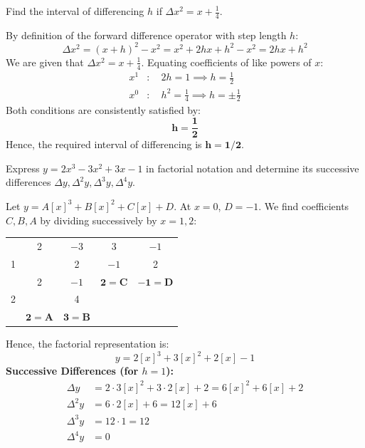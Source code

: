 \documentclass[11pt,a4paper]{article}
\begin{document}
\begin{exambox}
Find the interval of differencing $h$ if $\Delta x^2 = x + \frac{1}{4}$.
\end{exambox}

\begin{solbox}
By definition of the forward difference operator with step length $h$:
$$\Delta x^2 = (x + h)^2 - x^2 = x^2 + 2hx + h^2 - x^2 = 2hx + h^2$$
We are given that $\Delta x^2 = x + \frac{1}{4}$. Equating coefficients of like powers of $x$:
\begin{align*}
    x^1&: \quad 2h = 1 \implies h = \frac{1}{2} \\
    x^0&: \quad h^2 = \frac{1}{4} \implies h = \pm \frac{1}{2}
\end{align*}
Both conditions are consistently satisfied by:
$$\mathbf{h = \frac{1}{2}}$$
Hence, the required interval of differencing is $\mathbf{h = 1/2}$.
\end{solbox}

\begin{exambox}
Express $y = 2x^3 - 3x^2 + 3x - 1$ in factorial notation and determine its successive differences $\Delta y, \Delta^2 y, \Delta^3 y, \Delta^4 y$.
\end{exambox}

\begin{solbox}
Let $y = A[x]^3 + B[x]^2 + C[x] + D$.
At $x = 0$, $D = -1$.
We find coefficients $C, B, A$ by dividing successively by $x = 1, 2$:
\begin{center}
\begin{tabular}{c|cccc}
    & 2 & $-3$ & 3 & $-1$ \\
    1 & & 2 & $-1$ & 2 \\
    \hline
    & 2 & $-1$ & $\mathbf{2 = C}$ & $\mathbf{-1 = D}$ \\
    2 & & 4 & & \\
    \hline
    & $\mathbf{2 = A}$ & $\mathbf{3 = B}$ & &
\end{tabular}
\end{center}
Hence, the factorial representation is:
\begin{equation}
    \boxed{y = 2[x]^3 + 3[x]^2 + 2[x] - 1}
\end{equation}
\textbf{Successive Differences (for $h = 1$):}
\begin{align*}
    \Delta y &= 2 \cdot 3[x]^2 + 3 \cdot 2[x] + 2 = 6[x]^2 + 6[x] + 2 \\
    \Delta^2 y &= 6 \cdot 2[x] + 6 = 12[x] + 6 \\
    \Delta^3 y &= 12 \cdot 1 = 12 \\
    \Delta^4 y &= 0
\end{align*}
\end{solbox}
\end{document}
